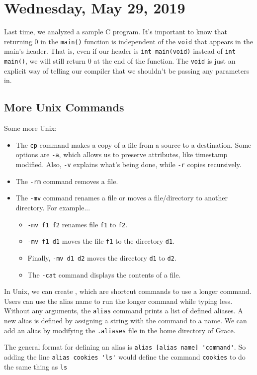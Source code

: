 \section{Wednesday, May 29, 2019}
Last time, we analyzed a sample C program. It's important to know that returning $0$ in the \verb!main()! function is independent of the \verb!void! that appears in the main's header. That is, even if our header is \verb!int main(void)! instead of \verb!int main()!, we will still return $0$ at the end of the function. The \verb!void! is just an explicit way of telling our compiler that we shouldn't be passing any parameters in.

\subsection{More Unix Commands}
Some more Unix: \begin{itemize}
    \item The \verb!cp! command makes a copy of a file from a source to a destination. Some options are \verb!-a!, which allows us to preserve attributes, like timestamp modified. Also, \verb!-v! explains what's being done, while \verb!-r! copies recursively.   
    \item The \verb!-rm! command removes a file.
    \item The \verb!-mv! command renames a file or moves a file/directory to another directory. For example...
    \begin{itemize}
        \item \verb!-mv f1 f2! renames file \verb!f1! to \verb!f2!. 
        \item \verb!-mv f1 d1! moves the file \verb!f1! to the directory \verb!d1!.
        \item Finally, \verb!-mv d1 d2! moves the directory \verb!d1! to \verb!d2!.  
        \item The \verb!-cat! command displays the contents of a file.
    \end{itemize}
\end{itemize}
In Unix, we can create , which are shortcut commands to use a longer command. Users can use the alias name to run the longer command while typing less. Without any arguments, the \verb!alias! command prints a list of defined aliases. A new alias is defined by assigning a string with the command to a name. We can add an alias by modifying the \verb!.aliases! file in the home directory of Grace. 

The general format for defining an alias is \verb!alias [alias name] 'command'!. So adding the line \verb!alias cookies 'ls'! would define the command \verb!cookies! to do the same thing as \verb!ls!

